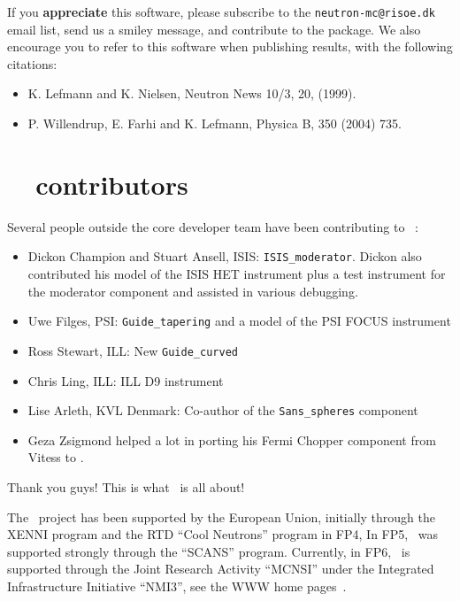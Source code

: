 If you {\bf appreciate} this software, please subscribe to the \verb+neutron-mc@risoe.dk+ email list, send us a smiley message, and contribute to the package. We also encourage you to refer to this software when publishing results, with the following citations:
\begin{itemize}
\item{K. Lefmann and K. Nielsen, Neutron News 10/3, 20, (1999).}
\item{P. Willendrup, E. Farhi and K. Lefmann, Physica B, 350 (2004) 735.}
\end{itemize}


\section*{\MCS\ \version\ contributors}
Several people outside the core developer team have been contributing
to \MCS\ \version:
\begin{itemize}
\item{Dickon Champion and Stuart Ansell, ISIS:
    \verb+ISIS_moderator+. Dickon also contributed his model of the
    ISIS HET instrument plus a test instrument for the moderator
    component and assisted in various debugging.}
\item{Uwe Filges, PSI: \verb+Guide_tapering+ and a model of the PSI
    FOCUS instrument}
\item{Ross Stewart, ILL: New \verb+Guide_curved+}
\item{Chris Ling, ILL: ILL D9 instrument}
\item{Lise Arleth, KVL Denmark: Co-author of the \verb+Sans_spheres+ component}
\item{Geza Zsigmond helped a lot in porting his Fermi Chopper component from Vitess \cite{Vitess,vitess_webpage} to \MCS .}
\end{itemize}
Thank you guys! This is what \MCS\ is all about!

The \MCS\ project has been supported by the European Union, initially
through the XENNI program and the RTD ``Cool Neutrons'' program in FP4,
In FP5, \MCS\ was supported strongly through the
``SCANS'' program.
Currently, in FP6, \MCS\ is supported through the Joint Research Activity
``MCNSI'' under the Integrated Infrastructure Initiative ``NMI3'', see
the WWW home pages~\cite{mcnsi_webpage,nmi3_webpage}.
